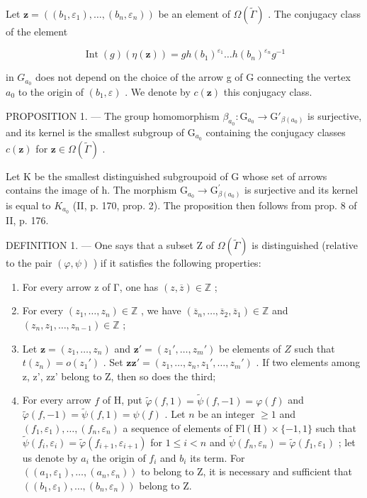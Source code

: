 Let \(\mathbf{z} = ((b_{1}, \varepsilon_{1}), \ldots, (b_{n}, \varepsilon_{n}))\) be an element of \(\Omega(\widetilde{\Gamma})\) . The conjugacy class of the element

\[
\operatorname{Int} (g) (\eta (\mathbf {z})) = g h (b _ {1}) ^ {\varepsilon_ {1}} \dots h (b _ {n}) ^ {\varepsilon_ {n}} g ^ {- 1}
\]

in \(G_{a_{0}}\) does not depend on the choice of the arrow g of G connecting the vertex \(a_{0}\) to the origin of \((b_{1},\varepsilon)\) . We denote by \(c(\mathbf{z})\) this conjugacy class.

PROPOSITION 1. --- The group homomorphism \(\beta_{a_0} \colon \mathrm{G}_{a_0} \to \mathrm{G}'_{\beta(a_0)}\) is surjective, and its kernel is the smallest subgroup of \(\mathrm{G}_{a_0}\) containing the conjugacy classes \(c(\mathbf{z})\) for \(\mathbf{z} \in \Omega(\widetilde{\Gamma})\) .

Let K be the smallest distinguished subgroupoid of G whose set of arrows contains the image of h. The morphism \(\mathrm{G}_{a_{0}} \rightarrow \mathrm{G}^{\prime}_{\beta(a_{0})}\) is surjective and its kernel is equal to \(K_{a_{0}}\) (II, p. 170, prop. 2). The proposition then follows from prop. 8 of II, p. 176.

DEFINITION 1. --- One says that a subset Z of \(\Omega(\widetilde{\Gamma})\) is distinguished (relative to the pair \((\varphi, \psi)\) ) if it satisfies the following properties:

\begin{enumerate}
\def\labelenumi{(\roman{enumi})}
\item
  For every arrow z of Γ, one has \((z,\overline{z})\in\mathbb{Z}\) ;
\item
  For every \((z_{1},\ldots ,z_{n})\in \mathbb{Z}\) , we have \((\overline{z}_n,\dots ,\overline{z}_2,\overline{z}_1)\in \mathbb{Z}\) and \((z_{n},z_{1},\ldots ,z_{n - 1})\in \mathbb{Z}\) ;
\item
  Let \(\mathbf{z} = (z_1, \ldots, z_n)\) and \(\mathbf{z}' = (z_1', \ldots, z_m')\) be elements of \(Z\) such that \(t(z_n) = o(z_1')\) . Set \(\mathbf{z}\mathbf{z}' = (z_1, \ldots, z_n, z_1', \ldots, z_m')\) . If two elements among z, z', zz' belong to Z, then so does the third;
\item
  For every arrow \(f\) of H, put \(\widetilde{\varphi}(f,1) = \widetilde{\psi}(f,-1) = \varphi(f)\) and \(\widetilde{\varphi}(f,-1) = \widetilde{\psi}(f,1) = \psi(f)\) . Let \(n\) be an integer \(\geqslant 1\) and \((f_1,\varepsilon_1),\ldots,(f_n,\varepsilon_n)\) a sequence of elements of \(\mathrm{Fl}(\mathrm{H})\times \{-1,1\}\) such that \(\widetilde{\psi}(f_i,\varepsilon_i) = \widetilde{\varphi}(f_{i+1},\varepsilon_{i+1})\) for \(1\leqslant i < n\) and \(\widetilde{\psi}(f_n,\varepsilon_n) = \widetilde{\varphi}(f_1,\varepsilon_1)\) ; let us denote by \(a_i\) the origin of \(f_i\) and \(b_i\) its term. For \(((a_1,\varepsilon_1),\ldots,(a_n,\varepsilon_n))\) to belong to Z, it is necessary and sufficient that \(((b_1,\varepsilon_1),\ldots,(b_n,\varepsilon_n))\) belong to Z.
\end{enumerate}

